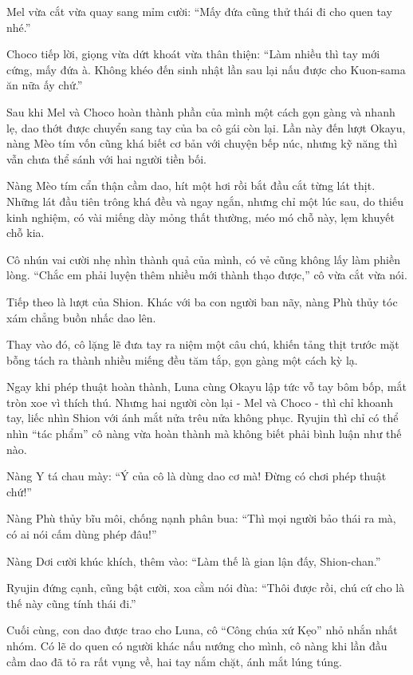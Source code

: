 \documentclass[../main.tex]{subfiles}
\begin{document}
Mel vừa cắt vừa quay sang mỉm cười: ``Mấy đứa cũng thử thái đi cho quen tay nhé.''

Choco tiếp lời, giọng vừa dứt khoát vừa thân thiện: ``Làm nhiều thì tay mới cứng, mấy đứa à. Không khéo đến sinh nhật lần sau lại nấu được cho Kuon-sama ăn nữa ấy chứ.''

\ct

Sau khi Mel và Choco hoàn thành phần của mình một cách gọn gàng và nhanh lẹ, dao thớt được chuyển sang tay của ba cô gái còn lại. Lần này đến lượt Okayu, nàng Mèo tím vốn cũng khá biết cơ bản với chuyện bếp núc, nhưng kỹ năng thì vẫn chưa thể sánh với hai người tiền bối.

Nàng Mèo tím cẩn thận cầm dao, hít một hơi rồi bắt đầu cắt từng lát thịt. Những lát đầu tiên trông khá đều và ngay ngắn, nhưng chỉ một lúc sau, do thiếu kinh nghiệm, có vài miếng dày mỏng thất thường, méo mó chỗ này, lẹm khuyết chỗ kia.

Cô nhún vai cười nhẹ nhìn thành quả của mình, có vẻ cũng không lấy làm phiền lòng. ``Chắc em phải luyện thêm nhiều mới thành thạo được,'' cô vừa cắt vừa nói.

Tiếp theo là lượt của Shion. Khác với ba con người ban nãy, nàng Phù thủy tóc xám chẳng buồn nhấc dao lên.

Thay vào đó, cô lặng lẽ đưa tay ra niệm một câu chú, khiến tảng thịt trước mặt bỗng tách ra thành nhiều miếng đều tăm tắp, gọn gàng một cách kỳ lạ.

Ngay khi phép thuật hoàn thành, Luna cùng Okayu lập tức vỗ tay bôm bốp, mắt tròn xoe vì thích thú. Nhưng hai người còn lại - Mel và Choco - thì chỉ khoanh tay, liếc nhìn Shion với ánh mắt nửa trêu nửa không phục. Ryujin thì chỉ có thể nhìn ``tác phẩm'' cô nàng vừa hoàn thành mà không biết phải bình luận như thế nào.

Nàng Y tá chau mày: ``Ý của cô là dùng dao cơ mà! Đừng có chơi phép thuật chứ!''

Nàng Phù thủy bĩu môi, chống nạnh phân bua: ``Thì mọi người bảo thái ra mà, có ai nói cấm dùng phép đâu!''

Nàng Dơi cười khúc khích, thêm vào: ``Làm thế là gian lận đấy, Shion-chan.''

Ryujin đứng cạnh, cũng bật cười, xoa cằm nói đùa: ``Thôi được rồi, chú cứ cho là thế này cũng tính thái đi.''

Cuối cùng, con dao được trao cho Luna, cô ``Công chúa xứ Kẹo'' nhỏ nhắn nhất nhóm. Có lẽ do quen có người khác nấu nướng cho mình, cô nàng khi lần đầu cầm dao đã tỏ ra rất vụng về, hai tay nắm chặt, ánh mắt lúng túng.
\end{document}
